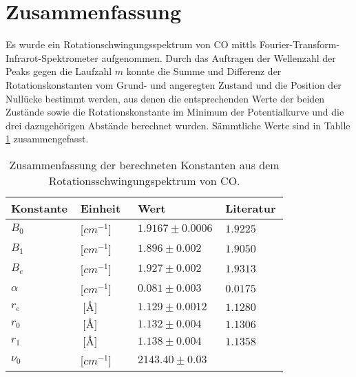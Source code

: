 % 
%
\section{Zusammenfassung}
Es wurde ein Rotationschwingungsspektrum von CO mittls Fourier-Transform-Infrarot-Spektrometer aufgenommen. Durch das Auftragen der Wellenzahl der Peaks gegen die Laufzahl $m$ konnte die Summe und Differenz der Rotationskonstanten vom Grund- und angeregten Zustand und die Position der Nullücke bestimmt werden, aus denen die entsprechenden Werte der beiden Zustände sowie die Rotationskonstante im Minimum der Potentialkurve und die drei dazugehörigen Abstände berechnet wurden. Sämmtliche Werte sind in Tablle \ref{Zusammenfassung} zusammengefasst.

\begin{table}
\label{Zusammenfassung}
	\caption{Zusammenfassung der berechneten Konstanten aus dem Rotationsschwingungspektrum von CO.  }
\begin{tabular}{C{0.2\linewidth}|C{0.2\linewidth}|C{0.2\linewidth}|C{0.2\linewidth}}
Konstante             & Einheit                  & Wert                           & Literatur \\ \hline
$B_0$                  & [$cm^{-1}$]          & $1.9167 \pm 0.0006$	& $1.9225$   \\
$B_1$                  & [$cm^{-1}$]          & $1.896 \pm 0.002$   	& $1.9050$   \\
$B_e $                 & [$cm^{-1}$]          & $1.927 \pm 0.002$   	& $1.9313$   \\
$\alpha$		& [$cm^{-1}$]       & $0.081 \pm 0.003$   	& $0.0175$   \\
$r_e$                  & $\SI{}{[\angstrom]}$		& $1.129 \pm 0.0012 $  	& $1.1280$     \\
$r_0$                  & $\SI{}{[\angstrom]} $		& $1.132 \pm 0.004$  	 & $1.1306$     \\
$r_1$                  & $\SI{}{[\angstrom]}$ 		& $1.138 \pm 0.004$  	 & $1.1358$    \\
$\nu_0$	&[$cm^{-1}$]          & $2143.40 \pm 0.03$&
\end{tabular}
\end{table}


%


